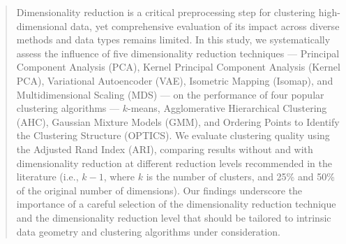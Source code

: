 \documentclass[preprint,12pt]{elsarticle}
\begin{document}
\begin{@twocolumnfalse}
\begin{frontmatter}



\begin{abstract}
Dimensionality reduction is a critical preprocessing step for clustering high-dimensional data, yet comprehensive evaluation of its impact across diverse methods and data types remains limited. In this study, we systematically assess the influence of five dimensionality reduction techniques — Principal Component Analysis (PCA), Kernel Principal Component Analysis (Kernel PCA), Variational Autoencoder (VAE), Isometric Mapping (Isomap), and Multidimensional Scaling (MDS) — on the performance of four popular clustering algorithms — $k$-means, Agglomerative Hierarchical Clustering (AHC), Gaussian Mixture Models (GMM), and Ordering Points to Identify the Clustering Structure (OPTICS). We evaluate clustering quality using the Adjusted Rand Index (ARI), comparing results without and with dimensionality reduction at different reduction levels recommended in the literature (i.e., $k-1$, where $k$ is the number of clusters, and 25\% and 50\% of the original number of dimensions).
Our findings underscore the importance of a careful selection of the dimensionality reduction technique and the dimensionality reduction level that should be tailored to intrinsic data geometry and clustering algorithms under consideration.


\end{abstract}
\end{frontmatter}
\end{@twocolumnfalse}
\end{document}

